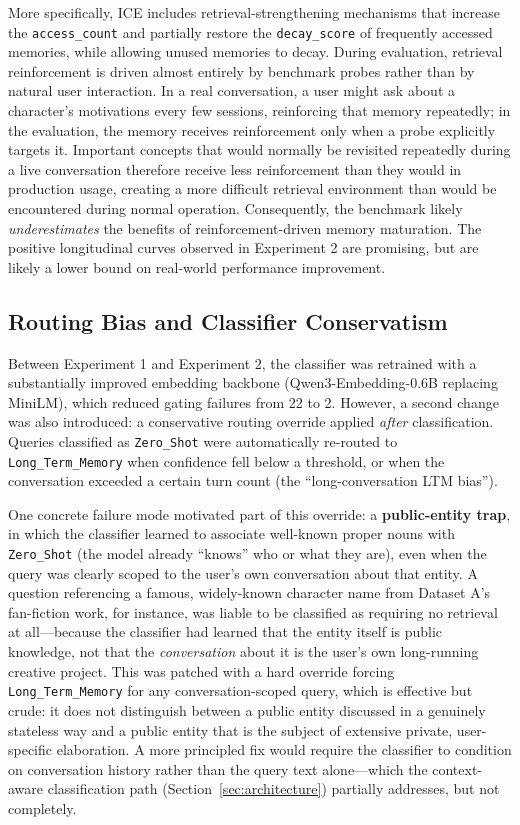 \documentclass[10pt]{article}
\begin{document}
More specifically, ICE includes retrieval-strengthening mechanisms that increase the \texttt{access\_count} and partially restore the \texttt{decay\_score} of frequently accessed memories, while allowing unused memories to decay. During evaluation, retrieval reinforcement is driven almost entirely by benchmark probes rather than by natural user interaction. In a real conversation, a user might ask about a character's motivations every few sessions, reinforcing that memory repeatedly; in the evaluation, the memory receives reinforcement only when a probe explicitly targets it. Important concepts that would normally be revisited repeatedly during a live conversation therefore receive less reinforcement than they would in production usage, creating a more difficult retrieval environment than would be encountered during normal operation. Consequently, the benchmark likely \emph{underestimates} the benefits of reinforcement-driven memory maturation. The positive longitudinal curves observed in Experiment 2 are promising, but are likely a lower bound on real-world performance improvement.

\subsection{Routing Bias and Classifier Conservatism}
Between Experiment 1 and Experiment 2, the classifier was retrained with a substantially improved embedding backbone (Qwen3-Embedding-0.6B replacing MiniLM), which reduced gating failures from 22 to 2. However, a second change was also introduced: a conservative routing override applied \emph{after} classification. Queries classified as \texttt{Zero\_Shot} were automatically re-routed to \texttt{Long\_Term\_Memory} when confidence fell below a threshold, or when the conversation exceeded a certain turn count (the ``long-conversation LTM bias'').

One concrete failure mode motivated part of this override: a \textbf{public-entity trap}, in which the classifier learned to associate well-known proper nouns with \texttt{Zero\_Shot} (the model already ``knows'' who or what they are), even when the query was clearly scoped to the user's own conversation about that entity. A question referencing a famous, widely-known character name from Dataset A's fan-fiction work, for instance, was liable to be classified as requiring no retrieval at all---because the classifier had learned that the entity itself is public knowledge, not that the \emph{conversation} about it is the user's own long-running creative project. This was patched with a hard override forcing \texttt{Long\_Term\_Memory} for any conversation-scoped query, which is effective but crude: it does not distinguish between a public entity discussed in a genuinely stateless way and a public entity that is the subject of extensive private, user-specific elaboration. A more principled fix would require the classifier to condition on conversation history rather than the query text alone---which the context-aware classification path (Section~\ref{sec:architecture}) partially addresses, but not completely.
\end{document}
